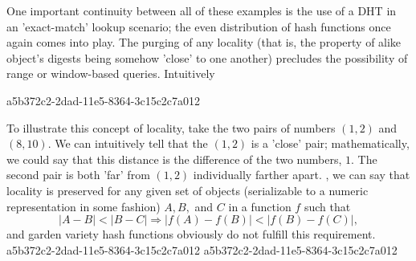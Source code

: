\documentclass[12pt]{article}
\begin{document}
\par One important continuity between all of these examples is the use of a DHT in an 'exact-match' lookup scenario; the even distribution of hash functions once again comes into play. The purging of any locality (that is, the property of alike object's digests being somehow 'close' to one another) precludes the possibility of range or window-based queries. Intuitively

a5b372c2-2dad-11e5-8364-3c15c2c7a012\par To illustrate this concept of locality, take the two pairs of numbers $(1,2)$ and $(8,10)$. We can intuitively tell that the $(1,2)$ is a 'close' pair; mathematically, we could say that this distance is the difference of the two numbers, $1$. The second pair is both 'far' from $(1,2)$ individually farther apart. , we can say that locality is preserved for any given set of objects (serializable to a numeric representation in some fashion) $A,B,$ and $C$ in a function $f$ such that
\begin{equation}
|A-B| < |B-C| \Rightarrow |f(A)-f(B)| < |f(B) - f(C)|,
\end{equation}
and garden variety hash functions obviously do not fulfill this requirement.
a5b372c2-2dad-11e5-8364-3c15c2c7a012
\printbibliography
a5b372c2-2dad-11e5-8364-3c15c2c7a012
\end{document}
